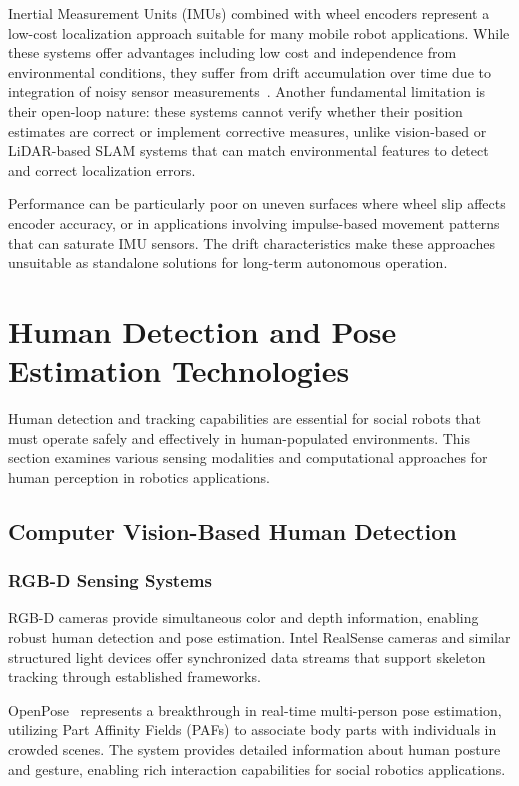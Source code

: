 Inertial Measurement Units (IMUs) combined with wheel encoders represent a low-cost localization approach suitable for many mobile robot applications. While these systems offer advantages including low cost and independence from environmental conditions, they suffer from drift accumulation over time due to integration of noisy sensor measurements~\cite{borenstein1996measurement}. Another fundamental limitation is their open-loop nature: these systems cannot verify whether their position estimates are correct or implement corrective measures, unlike vision-based or LiDAR-based SLAM systems that can match environmental features to detect and correct localization errors.

Performance can be particularly poor on uneven surfaces where wheel slip affects encoder accuracy, or in applications involving impulse-based movement patterns that can saturate IMU sensors. The drift characteristics make these approaches unsuitable as standalone solutions for long-term autonomous operation.

\section{Human Detection and Pose Estimation Technologies}
Human detection and tracking capabilities are essential for social robots that must operate safely and effectively in human-populated environments. This section examines various sensing modalities and computational approaches for human perception in robotics applications.

\subsection{Computer Vision-Based Human Detection}
\subsubsection{RGB-D Sensing Systems}
RGB-D cameras provide simultaneous color and depth information, enabling robust human detection and pose estimation. Intel RealSense cameras and similar structured light devices offer synchronized data streams that support skeleton tracking through established frameworks.

OpenPose~\cite{cao2019openpose} represents a breakthrough in real-time multi-person pose estimation, utilizing Part Affinity Fields (PAFs) to associate body parts with individuals in crowded scenes. The system provides detailed information about human posture and gesture, enabling rich interaction capabilities for social robotics applications.

